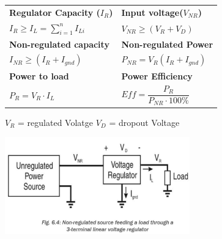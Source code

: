 \begin{tabular}{l l}
    \textbf{Regulator Capacity ($I_R$)}     & \textbf{Input voltage($V_{NR}$)} \\
    $ I_R \geq I_L = \sum_{i=1}^{n}I_{Li} $ & $ V_{NR} \geq  (V_R + V_D)$\\
    \textbf{Non-regulated capacity}         & \textbf{Non-regulated Power} \\
    $ I_{NR} \geq (I_R + I_{gnd}) $         & $ P_{NR}=V_R(I_R + I_{gnd}) $ \\
    \textbf{Power to load}                  & \textbf{Power Efficiency} \\
    $ P_R = V_R \cdot I_L $                 & $ Eff = \dfrac{P_R}{P_{NR}\cdot 100\%} $\\   
\end{tabular}
\begin{minipage}{2cm}
    {\scriptsize
    $V_R$ = regulated \newline \null\hspace{0.7cm} Volatge\newline
    $ V_D$ = dropout \newline \null\hspace{0.7cm} Voltage\newline } 
\end{minipage}
\begin{minipage}{5cm}
    \includegraphics[width=8cm]{images/NRPowerSource}
\end{minipage}
\clearpage
